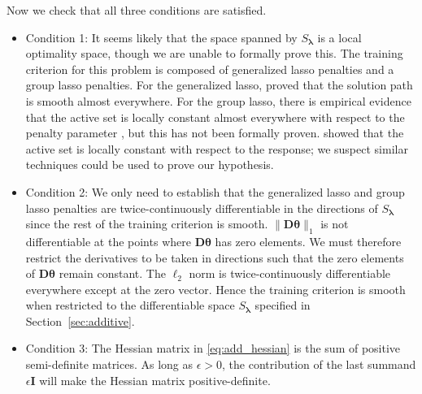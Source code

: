 \documentclass[12pt,letterpaper]{article}
\begin{document}
Now we check that all three conditions are satisfied. 
\begin{itemize}
	\item[] Condition 1: It seems likely that the space spanned by $S_{\boldsymbol{\lambda}}$ is a local optimality space, though we are unable to formally prove this. The training criterion for this problem is composed of generalized lasso penalties and a group lasso penalties. For the generalized lasso, \citet{tibshirani2011solution} proved that the solution path is smooth almost everywhere. For the group lasso, there is empirical evidence that the active set is locally constant almost everywhere with respect to the penalty parameter \citep{yuan2006model}, but this has not been formally proven. \citet{vaiter2012degrees} showed that the active set is locally constant with respect to the response; we suspect similar techniques could be used to prove our hypothesis.
	\item[] Condition 2:  We only need to establish that the generalized lasso and group lasso penalties are twice-continuously differentiable in the directions of $S_{\boldsymbol{\lambda}}$ since the rest of the training criterion is smooth. 
	$\| \boldsymbol{D} \boldsymbol{\theta} \|_1$ is not differentiable at the points where $\boldsymbol{D} \boldsymbol{\theta}$ has zero elements. We must therefore restrict the derivatives to be taken in directions such that the zero elements of $\boldsymbol{D} \boldsymbol{\theta}$ remain constant. The $\ell_2$ norm is twice-continuously differentiable everywhere except at the zero vector. Hence the training criterion is smooth when restricted to the differentiable space $S_{\boldsymbol{\lambda}}$ specified in Section~\ref{sec:additive}.
	\hfill {}
	\item[] Condition 3: The Hessian matrix in \eqref{eq:add_hessian} is the sum of positive semi-definite matrices. As long as $\epsilon > 0$, the contribution of the last summand $\epsilon \boldsymbol{I}$ will make the Hessian matrix positive-definite. \hfill {}
\end{itemize}
\end{document}

